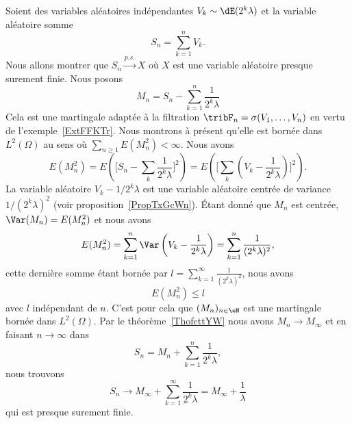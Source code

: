 \begin{example}
	Soient des variables aléatoires indépendantes \( V_k\sim\dE(2^k\lambda)\) et la variable aléatoire somme
	\begin{equation}
		S_n=\sum_{k=1}^nV_k.
	\end{equation}
	Nous allons montrer que \( S_n\stackrel{p.s.}{\longrightarrow}X\) où \( X\) est une variable aléatoire presque surement finie. Nous posons
	\begin{equation}
		M_n=S_n-\sum_{k=1}^n\frac{1}{ 2^k\lambda }
	\end{equation}
	Cela est une martingale adaptée à la filtration \( \tribF_n=\sigma(V_1,\ldots, V_n)\) en vertu de l'exemple~\ref{ExtFFKTr}. Nous montrons à présent qu'elle est bornée dans \( L^2(\Omega)\) au sens où \( \sum_{n\geq 1}E(M_n^2)<\infty\). Nous avons
	\begin{equation}
		E(M_n^2)=E\left( \big[ S_n-\sum_k\frac{1}{ 2^k\lambda } \big]^2 \right)=E\left( \big[ \sum_k(V_k-\frac{1}{ 2^k\lambda }) \big]^2 \right).
	\end{equation}
	La variable aléatoire \( V_k-1/2^k\lambda\) est une variable aléatoire centrée de variance \( 1/(2^k\lambda)^2\) (voir proposition~\ref{PropTxGcWn}). Étant donné que \( M_n\) est centrée, \( \Var(M_n)=E(M_n^2)\) et nous avons
	\begin{equation}
		E(M_n^2)=\sum_{k=1}^n\Var\left( V_k-\frac{1}{ 2^k\lambda } \right)=\sum_{k=1}^n\frac{1}{ (2^k\lambda)^2 },
	\end{equation}
	cette dernière somme étant bornée par \( l=\sum_{k=1}^{\infty}\frac{1}{ (2^k\lambda)^2 }\), nous avons
	\begin{equation}
		E(M_n^2)\leq l
	\end{equation}
	avec \( l\) indépendant de \( n\). C'est pour cela que \( (M_n)_{n\in \eN}\) est une martingale bornée dans \( L^2(\Omega)\). Par le théorème~\ref{ThofcttYW} nous avons \( M_n\to M_{\infty}\) et en faisant \( n\to \infty\) dans
	\begin{equation}
		S_n=M_n+\sum_{k=1}^n\frac{1}{ 2^k\lambda },
	\end{equation}
	nous trouvons
	\begin{equation}
		S_n\to M_{\infty}+\sum_{k=1}^{\infty}\frac{1}{ 2^k\lambda }=M_{\infty}+\frac{1}{ \lambda }
	\end{equation}
	qui est presque surement finie.
\end{example}

